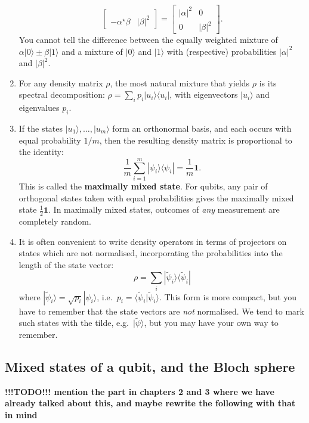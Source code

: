 \documentclass[fleqn]{article}
\begin{document}
\begin{enumerate}
\[\begin{bmatrix}
     \\-\alpha^\star\beta & |\beta|^2
     \end{bmatrix}
     =
     \begin{bmatrix}
       |\alpha|^2 & 0
     \\0 & |\beta|^2
     \end{bmatrix}.
   \]
  You cannot tell the difference between the equally weighted mixture of \(\alpha|0\rangle\pm\beta|1\rangle\) and a mixture of \(|0\rangle\) and \(|1\rangle\) with (respective) probabilities \(|\alpha|^2\) and \(|\beta|^2\).
\item
  For any density matrix \(\rho\), the most natural mixture that yields \(\rho\) is its spectral decomposition: \(\rho=\sum_i p_i|u_i\rangle\langle u_i|\), with eigenvectors \(|u_i\rangle\) and eigenvalues \(p_i\).
\item
  If the states \(|u_1\rangle,\ldots,|u_m\rangle\) form an orthonormal basis, and each occurs with equal probability \(1/m\), then the resulting density matrix is proportional to the identity:
  \[
     \frac{1}{m}\sum_{i=1}^m |\psi_i\rangle\langle\psi_i|
     = \frac{1}{m}\mathbf{1}.
   \]
  This is called the \textbf{maximally mixed state}.
  For qubits, any pair of orthogonal states taken with equal probabilities gives the maximally mixed state \(\frac12\mathbf{1}\).
  In maximally mixed states, outcomes of \emph{any} measurement are completely random.
\item
  It is often convenient to write density operators in terms of projectors on states which are not normalised, incorporating the probabilities into the length of the state vector:
  \[
     \rho = \sum_i|\widetilde\psi_i\rangle\langle\widetilde\psi_i|
   \]
  where \(|\widetilde\psi_i\rangle = \sqrt{p_i}|\psi_i\rangle\), i.e.~\(p_i=\langle\widetilde\psi_i|\widetilde\psi_i\rangle\).
  This form is more compact, but you have to remember that the state vectors are \emph{not} normalised.
  We tend to mark such states with the tilde, e.g.~\(|\widetilde\psi\rangle\), but you may have your own way to remember.
\end{enumerate}

\hypertarget{mixed-states-of-a-qubit-and-the-bloch-sphere}{%
\subsection{Mixed states of a qubit, and the Bloch sphere}\label{mixed-states-of-a-qubit-and-the-bloch-sphere}}

\textbf{!!!TODO!!! mention the part in chapters 2 and 3 where we have already talked about this, and maybe rewrite the following with that in mind}
\end{document}

